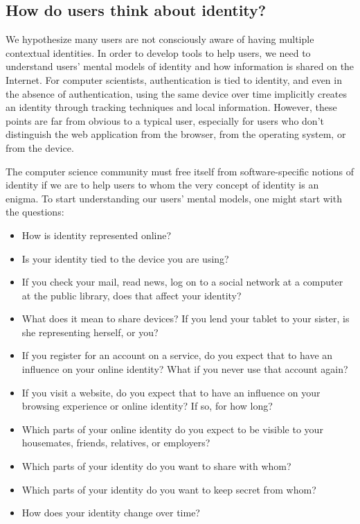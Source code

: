 \documentclass[10pt, conference, compsocconf]{IEEEtran}
\begin{document}
\subsection{How do users think about identity?}
We hypothesize many users are not consciously aware of having multiple
contextual identities. In order to develop tools to help users, we need to
understand users' mental models of identity and how information is shared on
the Internet. For computer scientists, authentication is tied to identity, and
even in the absence of authentication, using the same device over time
implicitly creates an identity through tracking techniques and local
information. However, these points are far from obvious to a typical user,
especially for users who don't distinguish the web application from the
browser, from the operating system, or from the device.

The computer science community must free itself from software-specific
notions of identity if we are to help users to whom the very concept of
identity is an enigma. To start understanding our users' mental models,
one might start with the questions:

\begin{itemize}
\item How is identity represented online?
\item Is your identity tied to the device you are using?
\item If you check your mail, read news, log on to a social network at a
computer at the public library, does that affect your identity?
\item What does it mean to share devices? If you lend your tablet to your
sister, is she representing herself, or you?
\item If you register for an account on a service, do you expect that to have
an influence on your online identity? What if you never use that account again?
\item If you visit a website, do you expect that to have an influence on your
browsing experience or online identity? If so, for how long?
\item Which parts of your online identity do you expect to be visible to
your housemates, friends, relatives, or employers?
\item Which parts of your identity do you want to share with whom?
\item Which parts of your identity do you want to keep secret from whom?
\item How does your identity change over time?
\end{itemize}
\end{document}
